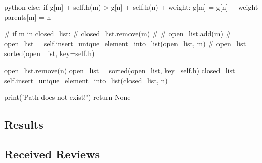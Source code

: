 \begin{mintedbox}{python}
                else:
                    if g[m] + self.h(m) > g[n] + self.h(n) + weight:
                        g[m] = g[n] + weight
                        parents[m] = n

                        # if m in closed_list:
                        #     closed_list.remove(m)
                        #     # open_list.add(m)
                        #     open_list = self.insert_unique_element_into_list(open_list, m)
                        #     open_list = sorted(open_list, key=self.h)


            open_list.remove(n)
            open_list = sorted(open_list, key=self.h)
            closed_list = self.insert_unique_element_into_list(closed_list, n)

        print('Path does not exist!')
        return None
\end{mintedbox}

\subsection{Results}

\subsection{Received Reviews}

